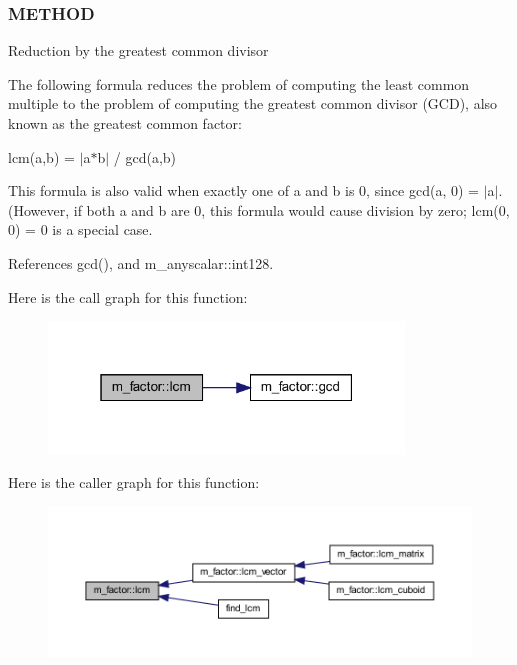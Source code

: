 \subsubsection*{M\+E\+T\+H\+OD}

Reduction by the greatest common divisor

The following formula reduces the problem of computing the least common multiple to the problem of computing the greatest common divisor (G\+CD), also known as the greatest common factor\+:

lcm(a,b) = $\vert$a$\ast$b$\vert$ / gcd(a,b)

This formula is also valid when exactly one of a and b is 0, since gcd(a, 0) = $\vert$a$\vert$. (However, if both a and b are 0, this formula would cause division by zero; lcm(0, 0) = 0 is a special case. 

References gcd(), and m\+\_\+anyscalar\+::int128.

Here is the call graph for this function\+:
\nopagebreak
\begin{figure}[H]
\begin{center}
\leavevmode
\includegraphics[width=268pt]{namespacem__factor_a363e0b451d99647a6230a308ffccc73c_cgraph}
\end{center}
\end{figure}
Here is the caller graph for this function\+:
\nopagebreak
\begin{figure}[H]
\begin{center}
\leavevmode
\includegraphics[width=350pt]{namespacem__factor_a363e0b451d99647a6230a308ffccc73c_icgraph}
\end{center}
\end{figure}
\mbox{\label{namespacem__factor_ae9aed0802e2c5a923b255f143ddf6e15}} 
